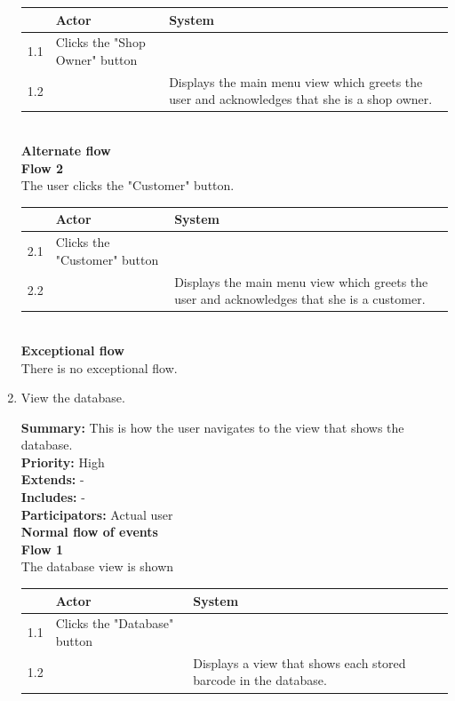 \documentclass{report}
\begin{document}
\begin{enumerate}
    \begin{tabular}{ | l | p{4cm} | p{4cm} |}
    \hline
      & Actor & System \\ \hline
    1.1 & Clicks the "Shop Owner" button & \\ \hline
    1.2 & & Displays the main menu view which greets the user and acknowledges that she is a shop owner. \\
    \hline
    \end{tabular} \\

    \textbf{Alternate flow} \\
    \textbf{Flow 2} \\ The user clicks the "Customer" button. \\

    \begin{tabular}{ | l | p{4cm} | p{4cm} |}
    \hline
      & Actor & System \\ \hline
    2.1 & Clicks the "Customer" button & \\ \hline
    2.2 & & Displays the main menu view which greets the user and acknowledges that she is a customer. \\
    \hline
    \end{tabular} \\

    \textbf{Exceptional flow} \\ There is no exceptional flow.

\pagebreak

  \item View the database. \

    \textbf{Summary:} This is how the user navigates to the view that shows the database. \\
    \textbf{Priority:} High \\
    \textbf{Extends:} - \\
    \textbf{Includes:} - \\
    \textbf{Participators:} Actual user \\
    \textbf{Normal flow of events} \\
    \textbf{Flow 1} \\ The database view is shown \\

    \begin{tabular}{ | l | p{4cm} | p{4cm} |}
    \hline
      & Actor & System \\ \hline
    1.1 & Clicks the "Database" button & \\ \hline
    1.2 & & Displays a view that shows each stored barcode in the database. \\
    \hline
    \end{tabular} \\


\end{enumerate}
\end{document}
